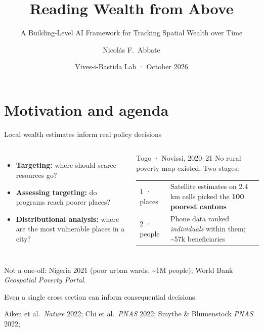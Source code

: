 \documentclass[10pt,aspectratio=169]{beamer}
\title[Reading wealth from above]{Reading Wealth from Above}
\subtitle{A Building-Level AI Framework for Tracking Spatial Wealth over Time}
\author{Nicolás F.\ Abbate}
\institute{NYU}
\date{Vives-i-Bastida Lab · October 2026}
\begin{document}
\begin{frame}
  \titlepage
\end{frame}

\section{Motivation and agenda}

\begin{frame}{Local wealth estimates inform real policy decisions}
\begin{columns}[T]
\footnotesize
\begin{itemize}
  \item \textbf{Targeting:} where should scarce resources go?
  \item \textbf{Assessing targeting:} do programs reach poorer places?
  \item \textbf{Distributional analysis:} where are the most vulnerable places in a city?
\end{itemize}
\vspace{-1em}
\pause
\begin{tbox}[blue]{Togo · Novissi, 2020–21}
\footnotesize
No rural poverty map existed. Two stages:\par\smallskip
\begin{tabularx}{\linewidth}{@{}l>{\raggedright\arraybackslash}X@{}}
{\ttfamily\color{mgAccent}1 · places} & Satellite estimates on 2.4\,km cells picked the \textbf{100 poorest cantons}\\[3pt]
{\ttfamily\color{mgAccent}2 · people} & Phone data ranked \emph{individuals} within them; \textasciitilde 57k beneficiaries\\
\end{tabularx}
\end{tbox}
\vspace{0.2em}
\end{columns}
\pause
{\scriptsize\color{mgMuted}Not a one-off: Nigeria 2021 (poor urban wards, \textasciitilde 1M people); World Bank \emph{Geospatial Poverty Portal}.}
\begin{ibox}
Even a single cross section can inform consequential decisions.
\end{ibox}
{\hfill\tiny\color{mgMuted}Aiken et al.\ \emph{Nature} 2022; Chi et al.\ \emph{PNAS} 2022; Smythe \& Blumenstock \emph{PNAS} 2022;
}
\end{frame}
\end{document}
